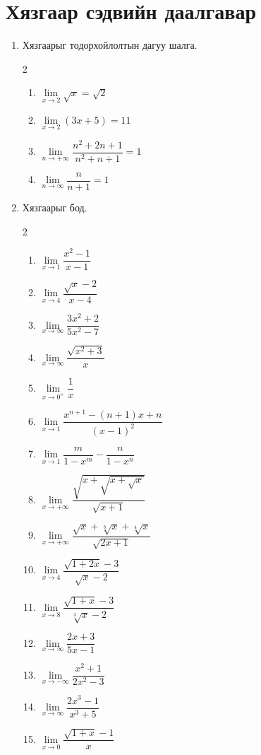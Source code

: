 \section*{Хязгаар сэдвийн даалгавар}
\begin{enumerate}
\item Хязгаарыг тодорхойлолтын дагуу шалга.
\begin{multicols}{2}
\begin{enumerate}
\item $\lim\limits_{x\to 2}\sqrt{x}=\sqrt{2}$ 
\item $\lim\limits_{x\to 2}(3x+5)=11$
\item $\lim\limits_{n\to +\infty}\dfrac{n^2+2n+1}{n^2+n+1}=1$
\item $\lim\limits_{n\to \infty}\dfrac{n}{n+1}=1$
\end{enumerate}
\end{multicols}
\item Хязгаарыг бод.
\begin{multicols}{2}
\begin{enumerate}
\item $\lim\limits_{x\to 1}\dfrac{x^2-1}{x-1}$
\item $\lim\limits_{x\to 4}\dfrac{\sqrt{x}-2}{x-4}$
\item $\lim\limits_{x\to \infty}\dfrac{3x^2+2}{5x^2-7}$
\item $\lim\limits_{x\to \infty}\dfrac{\sqrt{x^2+3}}{x}$
\item $\lim\limits_{x\to 0^+}\dfrac{1}{x}$
\item $\lim\limits _{x\to 1} \dfrac{x^{n+1}-(n+1)x+n}{(x-1)^2}$ 
\item $\lim\limits _{x\to 1} \dfrac{m}{1-x^m}-\dfrac{n}{1-x^n}$
\item $\lim\limits _{x\to +\infty} \dfrac{\sqrt{x+\sqrt{x+\sqrt{x}}}}{\sqrt{x+1}}$
\item $\lim\limits _{x\to +\infty} \dfrac{\sqrt{x}+\sqrt[3]{x}+\sqrt[4]{x}}{\sqrt{2x+1}}$ 
\item $\lim\limits _{x\to 4} \dfrac{\sqrt{1+2x}-3}{\sqrt{x}-2}$
\item $\lim\limits _{x\to 8} \dfrac{\sqrt{1+x}-3}{\sqrt[3]{x}-2}$
\item $\lim\limits_{x\to \infty}\dfrac{2x+3}{5x-1}$
\item $\lim\limits_{x\to -\infty}\dfrac{x^2+1}{2x^2-3}$
\item $\lim\limits_{x\to \infty}\dfrac{2x^3-1}{x^3+5}$
\item $\lim\limits_{x\to 0}\dfrac{\sqrt{1+x}-1}{x}$

\end{enumerate}
\end{multicols}
\end{enumerate}
